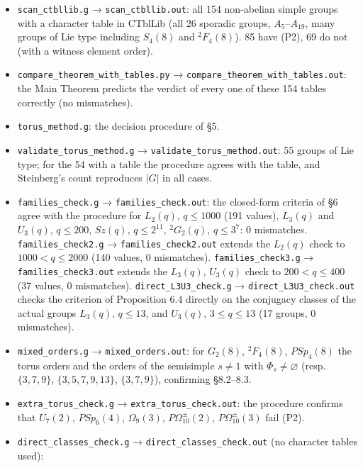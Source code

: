 \documentclass[11pt,a4paper]{article}
\providecommand{\tightlist}{\setlength{\itemsep}{1pt}\setlength{\parskip}{0pt}}
\begin{document}
\begin{itemize}
\tightlist
\item
  \texttt{scan\_ctbllib.g} → \texttt{scan\_ctbllib.out}: all 154
  non-abelian simple groups with a character table in CTblLib (all 26
  sporadic groups, \(A_5\)--\(A_{19}\), many groups of Lie type
  including \(S_4(8)\) and \({}^2F_4(8)\)). 85 have (P2), 69 do not
  (with a witness element order).
\item
  \texttt{compare\_theorem\_with\_tables.py} →
  \texttt{compare\_theorem\_with\_tables.out}: the Main Theorem predicts
  the verdict of every one of these 154 tables correctly (no
  mismatches).
\item
  \texttt{torus\_method.g}: the decision procedure of §5.
\item
  \texttt{validate\_torus\_method.g} →
  \texttt{validate\_torus\_method.out}: 55 groups of Lie type; for the
  54 with a table the procedure agrees with the table, and Steinberg's
  count reproduces \(|G|\) in all cases.
\item
  \texttt{families\_check.g} → \texttt{families\_check.out}: the
  closed-form criteria of §6 agree with the procedure for \(L_2(q)\),
  \(q\le1000\) (191 values), \(L_3(q)\) and \(U_3(q)\), \(q\le200\),
  \(Sz(q)\), \(q\le2^{11}\), \({}^2G_2(q)\), \(q\le3^7\): 0 mismatches.
  \texttt{families\_check2.g} → \texttt{families\_check2.out} extends
  the \(L_2(q)\) check to \(1000<q\le2000\) (140 values, 0 mismatches).
  \texttt{families\_check3.g} → \texttt{families\_check3.out} extends
  the \(L_3(q)\), \(U_3(q)\) check to \(200<q\le400\) (37 values, 0
  mismatches). \texttt{direct\_L3U3\_check.g} →
  \texttt{direct\_L3U3\_check.out} checks the criterion of Proposition
  6.4 directly on the conjugacy classes of the actual groups \(L_3(q)\),
  \(q\le13\), and \(U_3(q)\), \(3\le q\le13\) (17 groups, 0 mismatches).
\item
  \texttt{mixed\_orders.g} → \texttt{mixed\_orders.out}: for \(G_2(8)\),
  \({}^2F_4(8)\), \(PSp_4(8)\) the torus orders and the orders of the
  semisimple \(s\ne1\) with \(\Phi_s\ne\varnothing\) (resp.
  \(\{3,7,9\}\), \(\{3,5,7,9,13\}\), \(\{3,7,9\}\)), confirming
  §8.2--8.3.
\item
  \texttt{extra\_torus\_check.g} → \texttt{extra\_torus\_check.out}: the
  procedure confirms that \(U_7(2)\), \(PSp_6(4)\), \(\Omega_9(3)\),
  \(P\Omega^\pm_{10}(2)\), \(P\Omega^\pm_{10}(3)\) fail (P2).
\item
  \texttt{direct\_classes\_check.g} →
  \texttt{direct\_classes\_check.out} (no character tables used):

\end{itemize}
\end{document}
